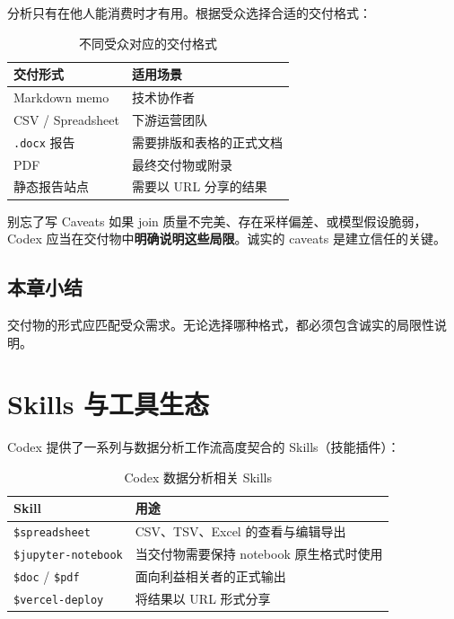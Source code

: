 \documentclass[a4paper]{article}
\begin{document}
分析只有在他人能消费时才有用。根据受众选择合适的交付格式：

\begin{table}[H]
\centering
\begin{tabular}{ll}
\toprule
\textbf{交付形式} & \textbf{适用场景} \\
\midrule
Markdown memo & 技术协作者 \\
CSV / Spreadsheet & 下游运营团队 \\
\texttt{.docx} 报告 & 需要排版和表格的正式文档 \\
PDF & 最终交付物或附录 \\
静态报告站点 & 需要以 URL 分享的结果 \\
\bottomrule
\end{tabular}
\caption{不同受众对应的交付格式}
\end{table}

\begin{importantbox}{别忘了写 Caveats}
如果 join 质量不完美、存在采样偏差、或模型假设脆弱，Codex 应当在交付物中\textbf{明确说明这些局限}。诚实的 caveats 是建立信任的关键。
\end{importantbox}

\subsection{本章小结}
交付物的形式应匹配受众需求。无论选择哪种格式，都必须包含诚实的局限性说明。

\section{Skills 与工具生态}

Codex 提供了一系列与数据分析工作流高度契合的 Skills（技能插件）：

\begin{table}[H]
\centering
\begin{tabular}{lp{9cm}}
\toprule
\textbf{Skill} & \textbf{用途} \\
\midrule
\texttt{\$spreadsheet} & CSV、TSV、Excel 的查看与编辑导出 \\
\texttt{\$jupyter-notebook} & 当交付物需要保持 notebook 原生格式时使用 \\
\texttt{\$doc} / \texttt{\$pdf} & 面向利益相关者的正式输出 \\
\texttt{\$vercel-deploy} & 将结果以 URL 形式分享 \\
\bottomrule
\end{tabular}
\caption{Codex 数据分析相关 Skills}
\end{table}
\end{document}
